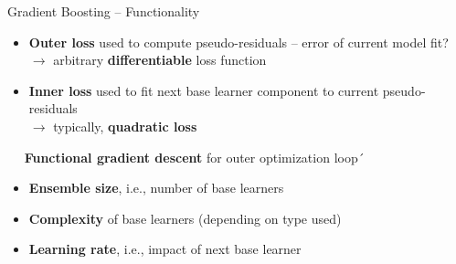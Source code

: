 \begin{frame}{Gradient Boosting -- Functionality}

\footnotesize


\begin{itemize}
  \item \textbf{Outer loss} used to compute pseudo-residuals -- error of 
  current model fit? \\
  $\rightarrow$ arbitrary \textbf{differentiable} loss function
  \item \textbf{Inner loss} used to fit next base learner component to 
  current pseudo-residuals \\
  $\rightarrow$ typically, \textbf{quadratic loss}
\end{itemize}

\medskip

 ~~ \textbf{Functional gradient descent} for outer 
optimization loop´

\medskip


\begin{itemize}
  \item \textbf{Ensemble size}, i.e., number of base learners
  \item \textbf{Complexity} of base learners (depending on type used)
  \item \textbf{Learning rate}, i.e., impact of next base learner
\end{itemize}

\medskip


\end{frame}


